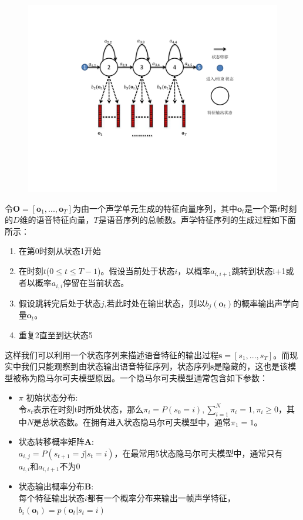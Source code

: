 \begin{figure}[!htp]
  \centering
    \captionstyle{\centering}
    \includegraphics[trim = 3cm 5cm 4cm 3cm, clip=true, width=.7\textwidth]{figure/hmm.pdf}
\end{figure}

令$\mathbf{O}=[\mathbf{o}_1, ..., \mathbf{o}_T]$为由一个声学单元生成的特征向量序列，其中$\mathbf{o}_t$是一个第$t$时刻的$D$维的语音特征向量，$T$是语音序列的总帧数。声学特征序列的生成过程如下面所示：
\begin{enumerate}
    \item 在第0时刻从状态1开始
    \item 在时刻$t$($0 \le t \le T-1$)。假设当前处于状态$i$，以概率$a_{i,i+1}$跳转到状态i+1或者以概率$a_{i,i}$停留在当前状态。
    \item 假设跳转完后处于状态$j$,若此时处在输出状态，则以$b_j(\mathbf{o}_t)$的概率输出声学向量$\mathbf{o}_t$。
    \item 重复2直至到达状态5
\end{enumerate}

这样我们可以利用一个状态序列来描述语音特征的输出过程$\mathbf{s}=[s_1, ..., s_T]$。而现实中我们只能观察到由状态输出语音特征序列，状态序列$\mathbf{s}$是隐藏的，这也是该模型被称为隐马尔可夫模型原因。一个隐马尔可夫模型通常包含如下参数：
\begin{itemize}
    \item $\pi$ 初始状态分布: \\
    令$s_t$表示在时刻t时所处状态，那么$\pi_i = P(s_0=i), \sum_{i=1}^N \pi_i = 1, \pi_i \ge 0$，其中$N$是总状态数。在拥有进入状态隐马尔可夫模型中，通常$\pi_1=1$。
    \item 状态转移概率矩阵$\mathbf{A}$: \\
    $a_{i,j}=P(s_{t+1}=j|s_t=i)$，在最常用5状态隐马尔可夫模型中，通常只有$a_{i,i}和a_{i,i+1}$不为0
    \item 状态输出概率分布$\mathbf{B}$: \\
    每个特征输出状态$i$都有一个概率分布来输出一帧声学特征，$b_i(\mathbf{o}_t)=p(\mathbf{o}_t|s_t=i)$
\end{itemize}

